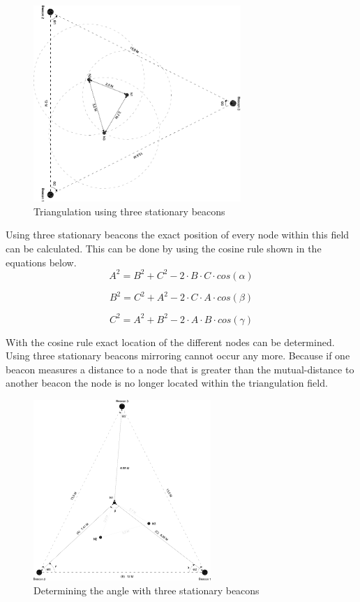 \documentclass[10pt,a4paper]{article}
\begin{document}
\begin{figure}[H]
\centering
\includegraphics[angle=90,width=0.7\textwidth]{driehoek.pdf}
\caption{Triangulation using three stationary beacons}
\label{driehoek}
\end{figure}

Using three stationary beacons the exact position of every node within this field can be calculated. This can be done by using the cosine rule shown in the equations below. 
\begin{equation}
A^2 = B^2 + C^2 - 2\cdot B\cdot C\cdot cos(\alpha)
\end{equation}

\begin{equation}
B^2 = C^2 + A^2 - 2\cdot C\cdot A\cdot cos(\beta)
\end{equation}

\begin{equation}
C^2 = A^2 + B^2 - 2\cdot A\cdot B\cdot cos(\gamma)
\end{equation}

With the cosine rule exact location of the different nodes can be determined. Using three stationary beacons mirroring cannot occur any more. Because if one beacon measures a distance to a node that is greater than the mutual-distance to another beacon the node is no longer located within the triangulation field.

\begin{figure}[H]
\centering
\includegraphics[width=0.6\textwidth]{triangulatie.pdf}
\caption{Determining the angle with three stationary beacons}
\label{triangulatie}
\end{figure}
\end{document}
